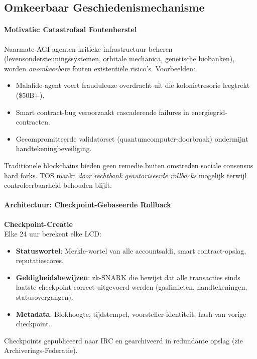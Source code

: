 \documentclass[11pt]{article}
\begin{document}
\subsection{Omkeerbaar Geschiedenismechanisme}

\paragraph{Motivatie: Catastrofaal Foutenherstel}
Naarmate AGI-agenten kritieke infrastructuur beheren (levensondersteuningssystemen, orbitale mechanica, genetische biobanken), worden \emph{onomkeerbare} fouten existentiële risico's. Voorbeelden:
\begin{itemize}[noitemsep]
  \item Malafide agent voert frauduleuze overdracht uit die kolonietresorie leegtrekt (\$50B+).
  \item Smart contract-bug veroorzaakt cascaderende failures in energiegrid-contracten.
  \item Gecompromitteerde validatorset (quantumcomputer-doorbraak) ondermijnt handtekeningbeveiliging.
\end{itemize}
Traditionele blockchains bieden geen remedie buiten omstreden sociale consensus hard forks. TOS maakt \emph{door rechtbank geautoriseerde rollbacks} mogelijk terwijl controleerbaarheid behouden blijft.

\paragraph{Architectuur: Checkpoint-Gebaseerde Rollback}
\textbf{Checkpoint-Creatie}\\
Elke 24 uur berekent elke LCD:
\begin{itemize}[noitemsep]
  \item \textbf{Statuswortel}: Merkle-wortel van alle accountsaldi, smart contract-opslag, reputatiescores.
  \item \textbf{Geldigheidsbewijzen}: zk-SNARK die bewijst dat alle transacties sinds laatste checkpoint correct uitgevoerd werden (gaslimieten, handtekeningen, statusovergangen).
  \item \textbf{Metadata}: Blokhoogte, tijdstempel, voorsteller-identiteit, hash van vorige checkpoint.
\end{itemize}
Checkpoints gepubliceerd naar IRC en gearchiveerd in redundante opslag (zie Archiverings-Federatie).
\end{document}
